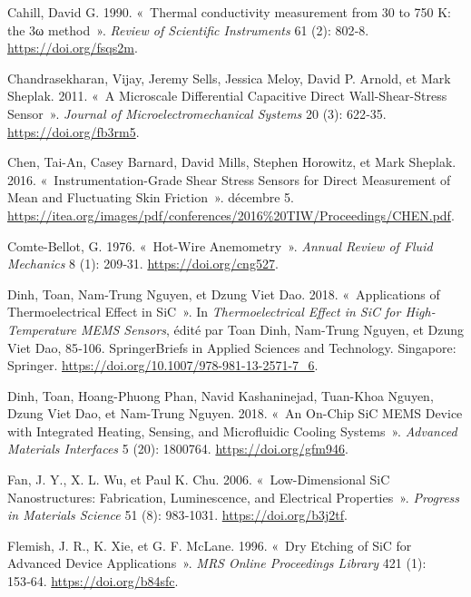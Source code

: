 \documentclass[
]{article}
\newlength{\cslhangindent}
\newenvironment{CSLReferences}[2] %
 {\begin{list}{}{%
  \setlength{\itemindent}{0pt}
  \setlength{\leftmargin}{0pt}
  \setlength{\parsep}{0pt}
  \ifodd #1
   \setlength{\leftmargin}{\cslhangindent}
   \setlength{\itemindent}{-1\cslhangindent}
  \fi
  \setlength{\itemsep}{#2\baselineskip}}}
 {\end{list}}
\begin{document}
\begin{CSLReferences}{1}{0}
Cahill, David G. 1990. {«~Thermal conductivity measurement from 30 to
750 K: the 3ω method~»}. \emph{Review of Scientific Instruments} 61 (2):
802‑8. \url{https://doi.org/fsqs2m}.

Chandrasekharan, Vijay, Jeremy Sells, Jessica Meloy, David P. Arnold, et
Mark Sheplak. 2011. {«~A Microscale Differential Capacitive Direct
Wall-Shear-Stress Sensor~»}. \emph{Journal of Microelectromechanical
Systems} 20 (3): 622‑35. \url{https://doi.org/fb3rm5}.

Chen, Tai-An, Casey Barnard, David Mills, Stephen Horowitz, et Mark
Sheplak. 2016. {«~Instrumentation-Grade Shear Stress Sensors for Direct
Measurement of Mean and Fluctuating Skin Friction~»}. décembre 5.
\url{https://itea.org/images/pdf/conferences/2016\%20TIW/Proceedings/CHEN.pdf}.

Comte-Bellot, G. 1976. {«~Hot-Wire Anemometry~»}. \emph{Annual Review of
Fluid Mechanics} 8 (1): 209‑31. \url{https://doi.org/cng527}.

Dinh, Toan, Nam-Trung Nguyen, et Dzung Viet Dao. 2018. {«~Applications
of Thermoelectrical Effect in SiC~»}. In \emph{Thermoelectrical Effect
in SiC for High-Temperature MEMS Sensors}, édité par Toan Dinh,
Nam-Trung Nguyen, et Dzung Viet Dao, 85‑106. SpringerBriefs in Applied
Sciences and Technology. Singapore: Springer.
\url{https://doi.org/10.1007/978-981-13-2571-7_6}.

Dinh, Toan, Hoang-Phuong Phan, Navid Kashaninejad, Tuan-Khoa Nguyen,
Dzung Viet Dao, et Nam-Trung Nguyen. 2018. {«~An On-Chip SiC MEMS Device
with Integrated Heating, Sensing, and Microfluidic Cooling Systems~»}.
\emph{Advanced Materials Interfaces} 5 (20): 1800764.
\url{https://doi.org/gfm946}.

Fan, J. Y., X. L. Wu, et Paul K. Chu. 2006. {«~Low-Dimensional SiC
Nanostructures: Fabrication, Luminescence, and Electrical Properties~»}.
\emph{Progress in Materials Science} 51 (8): 983‑1031.
\url{https://doi.org/b3j2tf}.

Flemish, J. R., K. Xie, et G. F. McLane. 1996. {«~Dry Etching of SiC for
Advanced Device Applications~»}. \emph{MRS Online Proceedings Library}
421 (1): 153‑64. \url{https://doi.org/b84sfc}.


\end{CSLReferences}
\end{document}

